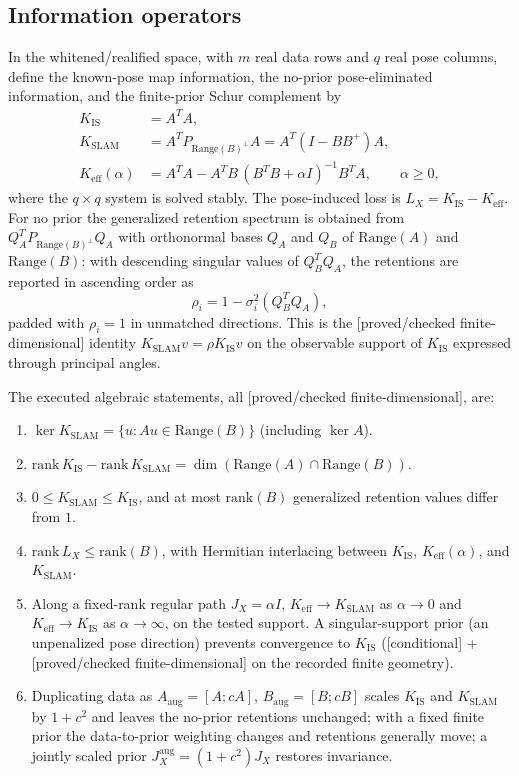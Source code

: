 \documentclass[12pt]{article}
\newcommand{\FDL}{\textnormal{[proved/checked finite-dimensional]}}
\newcommand{\CND}{\textnormal{[conditional]}}
\begin{document}
\subsection{Information operators}

In the whitened/realified space, with $m$ real data rows and $q$ real pose
columns, define the known-pose map information, the no-prior pose-eliminated
information, and the finite-prior Schur complement by
\begin{align}
K_{\mathrm{IS}}&=A^T A,\\
K_{\mathrm{SLAM}}&=A^T P_{\mathrm{Range}(B)^\perp}A
=A^T(I-BB^+)A,\\
K_{\mathrm{eff}}(\alpha)&=A^TA-A^TB\,(B^TB+\alpha I)^{-1}B^TA,
\qquad \alpha\ge 0,
\end{align}
where the $q\times q$ system is solved stably. The pose-induced loss is
$L_X=K_{\mathrm{IS}}-K_{\mathrm{eff}}$. For no prior the generalized retention
spectrum is obtained from $Q_A^T P_{\mathrm{Range}(B)^\perp}Q_A$ with
orthonormal bases $Q_A$ and $Q_B$ of $\mathrm{Range}(A)$ and
$\mathrm{Range}(B)$: with descending singular values of $Q_B^TQ_A$, the
retentions are reported in ascending order as
\[
\rho_i=1-\sigma_i^2(Q_B^TQ_A),
\]
padded with $\rho_i=1$ in unmatched directions. This is the
\FDL{} identity $K_{\mathrm{SLAM}}v=\rho K_{\mathrm{IS}}v$ on the observable
support of $K_{\mathrm{IS}}$ expressed through principal angles.

The executed algebraic statements, all \FDL{}, are:
\begin{enumerate}
\item $\ker K_{\mathrm{SLAM}}=\{u: Au\in \mathrm{Range}(B)\}$ (including
$\ker A$).
\item $\mathrm{rank}\,K_{\mathrm{IS}}-\mathrm{rank}\,K_{\mathrm{SLAM}}=
\dim(\mathrm{Range}(A)\cap\mathrm{Range}(B))$.
\item $0\le K_{\mathrm{SLAM}}\le K_{\mathrm{IS}}$, and at most
$\mathrm{rank}(B)$ generalized retention values differ from $1$.
\item $\mathrm{rank}\,L_X\le \mathrm{rank}(B)$, with Hermitian interlacing
between $K_{\mathrm{IS}}$, $K_{\mathrm{eff}}(\alpha)$, and $K_{\mathrm{SLAM}}$.
\item Along a fixed-rank regular path $J_X=\alpha I$, $K_{\mathrm{eff}}\to
K_{\mathrm{SLAM}}$ as $\alpha\to0$ and $K_{\mathrm{eff}}\to K_{\mathrm{IS}}$
as $\alpha\to\infty$, on the tested support. A singular-support prior (an
unpenalized pose direction) prevents convergence to $K_{\mathrm{IS}}$
(\CND{} + \FDL{} on the recorded finite geometry).
\item Duplicating data as $A_{\mathrm{aug}}=[A;cA]$,
$B_{\mathrm{aug}}=[B;cB]$ scales $K_{\mathrm{IS}}$ and $K_{\mathrm{SLAM}}$ by
$1+c^2$ and leaves the no-prior retentions unchanged; with a fixed finite
prior the data-to-prior weighting changes and retentions generally move; a
jointly scaled prior $J_X^{\mathrm{aug}}=(1+c^2)J_X$ restores invariance.
\end{enumerate}
\end{document}
